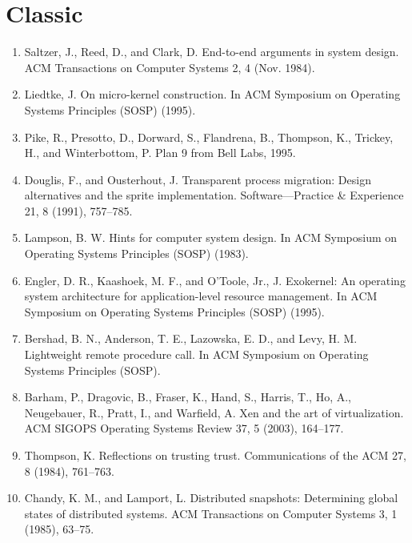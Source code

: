 \section{Classic}

\begin{enumerate}
\item  Saltzer, J., Reed, D., and Clark, D. End-to-end arguments in system design. ACM Transactions on Computer Systems 2, 4 (Nov. 1984).
\item Liedtke, J. On micro-kernel construction. In ACM Symposium on Operating Systems Principles (SOSP) (1995).
\item  Pike, R., Presotto, D., Dorward, S., Flandrena, B., Thompson, K., Trickey, H., and Winterbottom, P. Plan 9 from Bell Labs, 1995.
\item Douglis, F., and Ousterhout, J. Transparent process migration: Design
    alternatives and the sprite implementation. Software—Practice \& Experience 21, 8 (1991), 757–785.
\item  Lampson, B. W. Hints for computer system design. In ACM Symposium on Operating Systems Principles (SOSP) (1983).
\item Engler, D. R., Kaashoek, M. F., and O’Toole, Jr., J. Exokernel: An operating system architecture for application-level resource management. In ACM Symposium on Operating Systems Principles (SOSP) (1995).
\item  Bershad, B. N., Anderson, T. E., Lazowska, E. D., and Levy, H. M. Lightweight remote procedure call. In ACM Symposium on Operating Systems Principles (SOSP).
\item  Barham, P., Dragovic, B., Fraser, K., Hand, S., Harris, T., Ho, A., Neugebauer, R., Pratt, I., and Warfield, A. Xen and the art of virtualization. ACM SIGOPS Operating Systems Review 37, 5 (2003), 164–177.
\item Thompson, K. Reflections on trusting trust. Communications of the ACM 27, 8 (1984), 761–763.
\item Chandy, K. M., and Lamport, L. Distributed snapshots: Determining global states of distributed systems. ACM Transactions on Computer Systems 3, 1 (1985), 63–75.
\end{enumerate}


